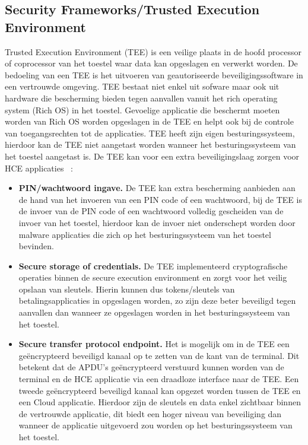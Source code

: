 \subsection{Security Frameworks/Trusted Execution Environment}
Trusted Execution Environment (TEE) is een veilige plaats in de hoofd processor of coprocessor van het toestel waar data kan opgeslagen en verwerkt worden. De bedoeling van een TEE is het uitvoeren van geautoriseerde beveiligingssoftware in een vertrouwde omgeving. TEE bestaat niet enkel uit sofware maar ook uit hardware die bescherming bieden tegen aanvallen vanuit het rich operating system (Rich OS) in het toestel. Gevoelige applicatie die beschermt moeten worden van Rich OS worden opgeslagen in de TEE en helpt ook bij de controle van toegangsrechten tot de applicaties. TEE heeft zijn eigen besturingssysteem, hierdoor kan de TEE niet aangetast worden wanneer het besturingssysteem van het toestel aangetast is. De TEE kan voor een extra beveiligingslaag zorgen voor HCE applicaties ~\autocite{SCA2014}:

\begin{itemize}
	\item \textbf{PIN/wachtwoord ingave.} De TEE kan extra bescherming aanbieden aan de hand van het invoeren van een PIN code of een wachtwoord, bij de TEE is de invoer van de PIN code of een wachtwoord volledig gescheiden van de invoer van het toestel, hierdoor kan de invoer niet onderschept worden door malware applicaties die zich op het besturingssysteem van het toestel bevinden.
	
	\item \textbf{Secure storage of credentials.} De TEE implementeerd cryptografische operaties binnen de secure execution environment en zorgt voor het veilig opslaan van sleutels. Hierin kunnen dus tokens/sleutels van betalingsapplicaties in opgeslagen worden, zo zijn deze beter beveiligd tegen aanvallen dan wanneer ze opgeslagen worden in het besturingssysteem van het toestel.
	
	\item \textbf{Secure transfer protocol endpoint.} Het is mogelijk om in de TEE een geëncrypteerd beveiligd kanaal op te zetten van de kant van de terminal. Dit betekent dat de APDU's geëncrypteerd verstuurd kunnen worden van de terminal en de HCE applicatie via een draadloze interface naar de TEE. Een tweede geëncrypteerd beveiligd kanaal kan opgezet worden tussen de TEE en een Cloud applicatie. Hierdoor zijn de sleutels en data enkel zichtbaar binnen de vertrouwde applicatie, dit biedt een hoger niveau van beveiliging dan wanneer de applicatie uitgevoerd zou worden op het besturingssysteem van het toestel.
\end{itemize}

